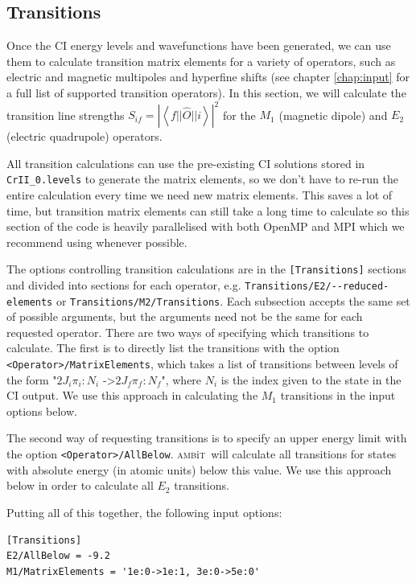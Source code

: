 \documentclass{report}
\newcommand{\ambit}{\textsc{amb}{\footnotesize i}\textsc{t}}
\begin{document}
\subsection{Transitions}

Once the CI energy levels and wavefunctions have been generated, we can use them to calculate transition
matrix elements for a variety of operators, such as electric and magnetic multipoles and hyperfine
shifts (see chapter \ref{chap:input} for a full list of supported transition operators). In this 
section, we will calculate the transition line strengths $S_{if} =
\left|\left<f||\hat{O}||i\right>\right|^2$ for 
the $M_1$ (magnetic dipole) and $E_2$ (electric quadrupole) operators.

All transition calculations can use the pre-existing CI solutions stored in \texttt{CrII\_0.levels} to 
generate the matrix elements, so we don't have to re-run the entire calculation every time we need new
matrix elements. This saves a lot of time, but transition matrix elements can still take a long time to
calculate so this section of the code is heavily parallelised with both OpenMP and MPI which we
recommend using whenever possible.

The options controlling transition calculations are in the \texttt{[Transitions]} sections and divided
into sections for each operator, e.g. \texttt{Transitions/E2/{-}{-}reduced-elements} or 
\texttt{Transitions/M2/Transitions}. Each subsection accepts the same set of possible arguments, but 
the arguments need not be the same for each requested operator. There are two ways of specifying which
transitions to calculate. The first is to directly list the transitions with the option
\texttt{<Operator>/MatrixElements}, which takes a list of transitions between levels of the form
"$2J_i\pi_i:N_i$ -\textgreater $2J_f\pi_f:N_f$", where $N_i$ is the index given to the state in the CI
output. We use this approach in calculating the $M_1$ transitions in the input options below.

The second way of requesting transitions is to specify an upper energy limit with the option
\texttt{<Operator>/AllBelow}. \ambit\  will calculate all transitions for states with absolute energy (in
atomic units) below this value. We use this approach below in order to calculate all $E_{2}$ 
transitions.

Putting all of this together, the following input options:

\begin{verbatim}
[Transitions]                                                                  
E2/AllBelow = -9.2                                                                
M1/MatrixElements = '1e:0->1e:1, 3e:0->5e:0'
\end{verbatim}
\end{document}
